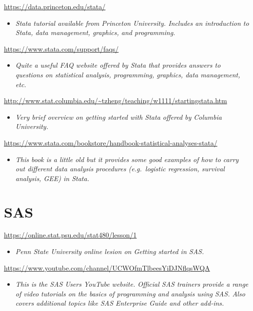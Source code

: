 \documentclass[
]{book}
\providecommand{\tightlist}{%
  \setlength{\itemsep}{0pt}\setlength{\parskip}{0pt}}
\begin{document}
\url{https://data.princeton.edu/stata/}

\begin{itemize}
\tightlist
\item
  \emph{Stata tutorial available from Princeton University. Includes an introduction to Stata, data management, graphics, and programming.}
\end{itemize}

\url{https://www.stata.com/support/faqs/}

\begin{itemize}
\tightlist
\item
  \emph{Quite a useful FAQ website offered by Stata that provides answers to questions on statistical analysis, programming, graphics, data management, etc.}
\end{itemize}

\url{http://www.stat.columbia.edu/~tzheng/teaching/w1111/startingstata.htm}

\begin{itemize}
\tightlist
\item
  \emph{Very brief overview on getting started with Stata offered by Columbia University.}
\end{itemize}

\url{https://www.stata.com/bookstore/handbook-statistical-analyses-stata/}

\begin{itemize}
\tightlist
\item
  \emph{This book is a little old but it provides some good examples of how to carry out different data analysis procedures (e.g.~logistic regression, survival analysis, GEE) in Stata.}
\end{itemize}

\hypertarget{sas}{%
\section{SAS}\label{sas}}

\url{https://online.stat.psu.edu/stat480/lesson/1}

\begin{itemize}
\tightlist
\item
  \emph{Penn State University online lesion on Getting started in SAS.}
\end{itemize}

\url{https://www.youtube.com/channel/UCWOfmTlbeesYiDJNflqsWQA}

\begin{itemize}
\tightlist
\item
  \emph{This is the SAS Users YouTube website. Official SAS trainers provide a range of video tutorials on the basics of programming and analysis using SAS. Also covers additional topics like SAS Enterprise Guide and other add-ins.}
\end{itemize}
\end{document}
